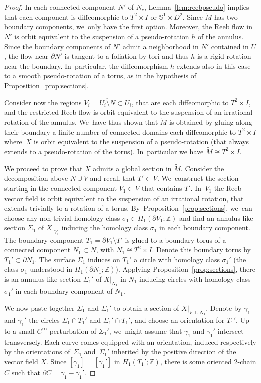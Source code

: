 \documentclass[10pt]{amsart}
\theoremstyle{definition}
\begin{document}
\begin{proof}
In each connected component $N'$ of $N_c$, Lemma~\ref{lem:reebpseudo} implies that each component is diffeomorphic to $T^2\times I$ or $\mathbb{S}^1\times D^2$. Since $\widetilde M$ has two boundary components, we~only have the first option. Moreover, the Reeb flow in $N'$ is orbit equivalent to the suspension of a pseudo-rotation $h$ of the annulus. Since the boundary components of $N'$ admit a neighborhood in $N'$ contained in $U$, the flow near $\partial N'$ is tangent to a foliation by tori and thus $h$ is a rigid rotation near the boundary. In~particular, the diffeomorphism $h$ extends also in this case to a smooth pseudo-rotation of a torus, as in the hypothesis of Proposition~\ref{prop:sections}.

Consider now the regions $V_i=\overline{U_i\setminus N}\subset U_i$, that are each diffeomorphic to $T^2\times I$, and the restricted Reeb flow is orbit equivalent to the suspension of an irrational rotation of the annulus. We~have thus shown that $\widetilde{M}$ is obtained by gluing along their boundary a finite number of connected domains each diffeomorphic to $T^2\times I$ where~$X$ is orbit equivalent to the suspension of a pseudo-rotation (that always extends to a pseudo-rotation of the torus). In~particular we have $\widetilde{M}\cong T^2\times I$.

{We proceed to prove that $X$ admits a global section in $\widetilde M$.} Consider the decomposition above $N\cup V$ and recall that $T'\subset V$. We~construct the section starting in the connected component $V_1\subset V$ that contains $T'$. In~$V_1$ the Reeb vector field is orbit equivalent to the suspension of an irrational rotation, that extends trivially to a rotation of a torus. By~Proposition~\ref{prop:sections}, we~can choose any non-trivial homology class $\sigma_1 \in H_1(\partial V_1; \mathbb{Z})$ and find an annulus-like section $\Sigma_1$ of $X|_{V_1}$ inducing the homology class $\sigma_1$ in each boundary component. The boundary component $T_1=\partial V_1\setminus T'$ is glued to a boundary torus of a connected component $N_1\subset N$, with $N_1\cong T^2\times I$. Denote this boundary torus by $T_1'\subset \partial N_1$. The surface $\Sigma_1$ induces on $T_1'$ a circle with homology class $\sigma_1'$ (the class $\sigma_1$ understood in $H_1(\partial N_1;\mathbb{Z})$). Applying Proposition~\ref{prop:sections}, there is an annulus-like section $\Sigma_1'$ of $X|_{N_1}$ in $N_1$ inducing circles with homology class~$\sigma_1'$ in each boundary component of $N_1$.

We now paste together $\Sigma_1$ and $\Sigma_1'$ to obtain a section of $X|_{V_1\cup N_1}$. Denote by $\gamma_1$ and $\gamma_1'$ the circles $\Sigma_1\cap T_1'$ and $\Sigma_1'\cap T_1'$, and choose an orientation for $T_1'$. Up to a small $C^\infty$ perturbation of $\Sigma_1'$, we~might assume that $\gamma_1$ and $\gamma_1'$ intersect transversely. Each curve comes equipped with an orientation, induced respectively by the orientations of~$\Sigma_1$ and~$\Sigma_1'$ inherited by the positive direction of the vector field $X$. Since $[\gamma_1]=[\gamma_1']$ in $H_1(T_1';\mathbb{Z})$, there is some oriented $2$-chain $C$ such that $\partial C=\gamma_1-\gamma_1'$.


\end{proof}
\end{document}
